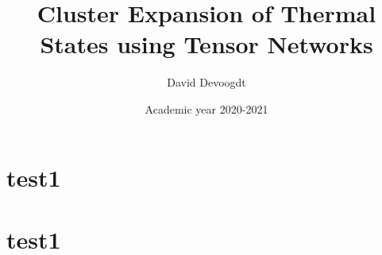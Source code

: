 \documentclass[twocolumn]{article}
\title{Cluster Expansion of Thermal States using Tensor
Networks}
\author{David Devoogdt}
\date{Academic year 2020-2021}
\begin{document}
\maketitle

\begin{abstract}
    
\end{abstract}

\section{test1}
\cite{Vanhecke2021}

\lipsum

\section{test1}
\lipsum



\end{document}
